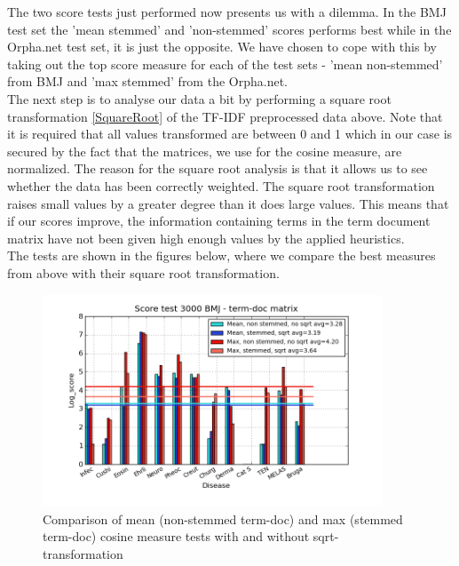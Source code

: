 The two score tests just performed now presents us with a dilemma. In the BMJ test set 
the 'mean stemmed' and 'non-stemmed' scores performs best while in the Orpha.net test set, 
it is just the opposite. We have chosen to cope with this by taking out the top score 
measure for each of the test sets - 'mean non-stemmed' from BMJ and 'max stemmed' from 
the Orpha.net. \\

The next step is to analyse our data a bit by performing a square root transformation 
\ref{SquareRoot} of the TF-IDF preprocessed data above. Note that it is required that 
all values transformed are between 0 and 1 which in our case is secured by the fact 
that the matrices, we use for the cosine measure, are normalized. The reason for the 
square root analysis is that it allows us to see whether the data has been correctly 
weighted. The square root transformation raises small values by a greater degree than 
it does large values. This means that if our scores improve, the information containing 
terms in the term document matrix have not been given high enough values by the applied 
heuristics. \\

The tests are shown in the figures below, where we compare the best measures from above 
with their square root transformation.

\begin{figure}[H]
        \begin{center}
          \includegraphics[width=0.9\textwidth]{barcharts/termDoc_bmj_hist_3000_ns_mea_ns_mea_sqr_s_max_s_max_sqr.png}
        \end{center}
        \caption{Comparison of mean (non-stemmed term-doc) and max (stemmed term-doc) cosine measure tests with and without sqrt-transformation}
        \label{termDoc_bmj_hist_3000_ns_mea_ns_mea_sqr_s_max_s_max_sqr}
\end{figure}


